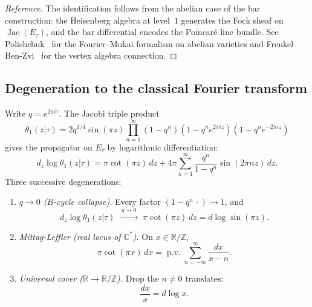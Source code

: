\begin{proof}[Reference]
The identification follows from the abelian case of the bar
construction: the Heisenberg algebra at level~$1$ generates the Fock
sheaf on $\operatorname{Jac}(E_\tau)$, and the bar differential
encodes the Poincar\'e line bundle.  See
Polishchuk~\cite{Pol03} for the Fourier--Mukai formalism on abelian
varieties and Frenkel--Ben-Zvi~\cite{FBZ04} for the vertex algebra
connection.
\end{proof}

\subsection*{Degeneration to the classical Fourier transform}
\label{subsec:fourier-degeneration}

\begin{proposition}
\label{prop:fourier-propagator-degeneration}
Write $q = e^{2\pi i\tau}$.
The Jacobi triple product
\[
\theta_1(z|\tau)
= 2q^{1/4}\sin(\pi z)
  \prod_{n=1}^{\infty}
  (1-q^n)(1-q^n e^{2\pi iz})(1-q^n e^{-2\pi iz})
\]
gives the propagator on $E_\tau$ by logarithmic differentiation:
\begin{equation}\label{eq:fourier-theta-product}
d_z\log\theta_1(z|\tau)
= \pi\cot(\pi z)\,dz
  + 4\pi\sum_{n=1}^{\infty}
  \frac{q^n}{1-q^n}\sin(2\pi n z)\,dz.
\end{equation}
Three successive degenerations:
\begin{enumerate}
\item \emph{$q \to 0$ \textup{(}$B$-cycle collapse\textup{)}.}
  Every factor $(1 - q^n\,\cdot) \to 1$, and
  \begin{equation}\label{eq:fourier-propagator-degen}
  d_z\log\theta_1(z|\tau)
  \;\xrightarrow{\;q \to 0\;}\;
  \pi\cot(\pi z)\,dz
  = d\log\sin(\pi z).
  \end{equation}
\item \emph{Mittag-Leffler \textup{(}real locus of $\mathbb{C}^*$\textup{)}.}
  On $x \in \mathbb{R}/\mathbb{Z}$,
  \begin{equation}\label{eq:fourier-propagator-real}
  \pi\cot(\pi x)\,dx
  = \operatorname{p.v.}\!\sum_{n=-\infty}^{\infty}
    \frac{dx}{x - n}.
  \end{equation}
\item \emph{Universal cover \textup{(}$\mathbb{R} \to \mathbb{R}/\mathbb{Z}$\textup{)}.}
  Drop the $n \neq 0$ translates:
  \begin{equation}\label{eq:fourier-propagator-R}
  \frac{dx}{x} = d\log x.
  \end{equation}
\end{enumerate}
\end{proposition}

